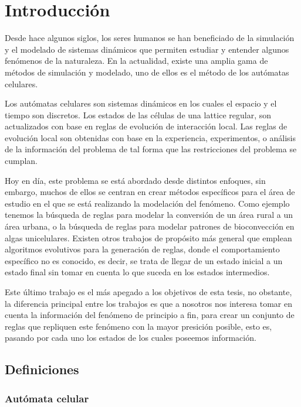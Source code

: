 \pagebreak  %
\cleardoublepage
\pagestyle{fancy}
\fancyhf{}
\lhead{\leftmark}
\rhead{\thepage}

\chapter{Introducción}
%
Desde hace algunos siglos, los seres humanos se han beneficiado de la simulación y el modelado de sistemas dinámicos que permiten estudiar y entender algunos fenómenos de la naturaleza. En la actualidad, existe una amplia gama de métodos de simulación y modelado, uno de ellos es el método de los autómatas celulares. 

Los autómatas celulares son sistemas dinámicos en los cuales el espacio y el tiempo son discretos. Los estados de las células de una lattice regular, son actualizados con base en reglas de evolución de interacción local. Las reglas de evolución local son obtenidas con base en la experiencia, experimentos, o análisis de la información del problema de tal forma que las restricciones del problema se cumplan.

Hoy en día, este problema se está abordado desde distintos enfoques, sin embargo, muchos de ellos se centran en crear métodos específicos para el área de estudio en el que se está realizando la modelación del fenómeno. Como ejemplo tenemos la búsqueda de reglas para modelar la conversión de un área rural a un área urbana, o la búsqueda de reglas para modelar patrones de bioconvección en algas unicelulares. Existen otros trabajos de propósito más general que emplean algoritmos evolutivos para la generación de reglas, donde el comportamiento específico no es conocido, es decir, se trata de llegar de un estado inicial a un estado final sin tomar en cuenta lo que suceda en los estados intermedios.

Este último trabajo es el más apegado a los objetivos de esta tesis, no obstante, la diferencia principal entre los trabajos es que a nosotros nos interesa tomar en cuenta la información del fenómeno de principio a fin, para crear un conjunto de reglas que repliquen este fenómeno con la mayor presición posible, esto es, pasando por cada uno los estados de los cuales poseemos información.

\section{Definiciones}

\subsection{Autómata celular}

